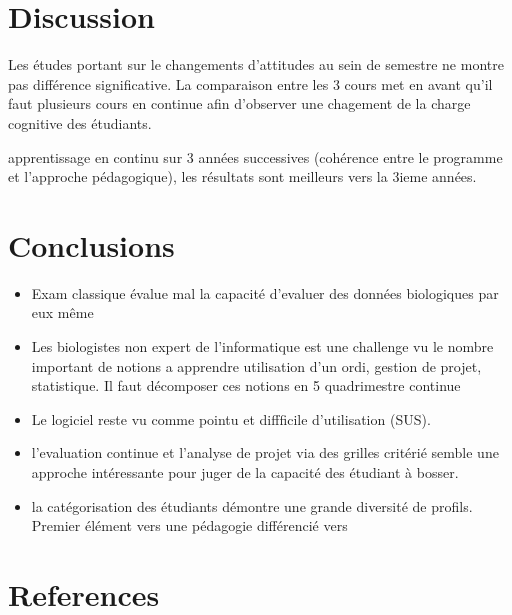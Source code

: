 \documentclass[
]{article}
\begin{document}
\hypertarget{discussion}{%
\section{Discussion}\label{discussion}}

Les études portant sur le changements d'attitudes au sein de semestre ne
montre pas différence significative. La comparaison entre les 3 cours
met en avant qu'il faut plusieurs cours en continue afin d'observer une
chagement de la charge cognitive des étudiants.

apprentissage en continu sur 3 années successives (cohérence entre le
programme et l'approche pédagogique), les résultats sont meilleurs vers
la 3ieme années.

\hypertarget{conclusions}{%
\section{Conclusions}\label{conclusions}}

\begin{itemize}
\item
  Exam classique évalue mal la capacité d'evaluer des données
  biologiques par eux même
\item
  Les biologistes non expert de l'informatique est une challenge vu le
  nombre important de notions a apprendre utilisation d'un ordi, gestion
  de projet, statistique. Il faut décomposer ces notions en 5
  quadrimestre continue
\item
  Le logiciel reste vu comme pointu et diffficile d'utilisation (SUS).
\item
  l'evaluation continue et l'analyse de projet via des grilles critérié
  semble une approche intéressante pour juger de la capacité des
  étudiant à bosser.
\item
  la catégorisation des étudiants démontre une grande diversité de
  profils. Premier élément vers une pédagogie différencié vers
\end{itemize}

\hypertarget{references}{%
\section*{References}\label{references}}
\end{document}
